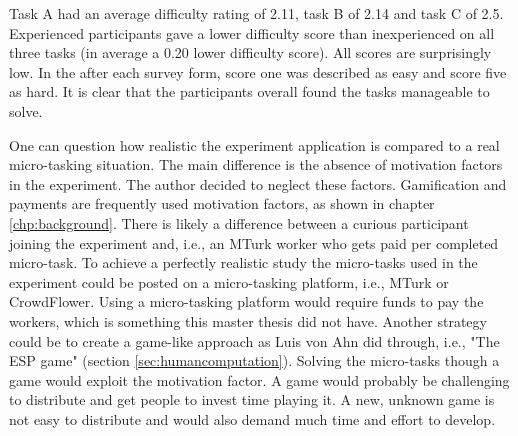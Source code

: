 Task A had an average difficulty rating of 2.11, task B of 2.14 and task C of 2.5. Experienced participants gave a lower difficulty score than inexperienced on all three tasks (in average a 0.20 lower difficulty score). All scores are surprisingly low. In the after each survey form, score one was described as easy and score five as hard. It is clear that the participants overall found the tasks manageable to solve. 


One can question how realistic the experiment application is compared to a real micro-tasking situation. The main difference is the absence of motivation factors in the experiment. The author decided to neglect these factors. Gamification and payments are frequently used motivation factors, as shown in chapter \ref{chp:background}. There is likely a difference between a curious participant joining the experiment and, i.e., an MTurk worker who gets paid per completed micro-task. To achieve a perfectly realistic study the micro-tasks used in the experiment could be posted on a micro-tasking platform, i.e., MTurk or CrowdFlower. Using a micro-tasking platform would require funds to pay the workers, which is something this master thesis did not have. Another strategy could be to create a game-like approach as Luis von Ahn did through, i.e., "The ESP game" (section \ref{sec:humancomputation}). Solving the micro-tasks though a game would exploit the motivation factor. A game would probably be challenging to distribute and get people to invest time playing it. A new, unknown game is not easy to distribute and would also demand much time and effort to develop. 

